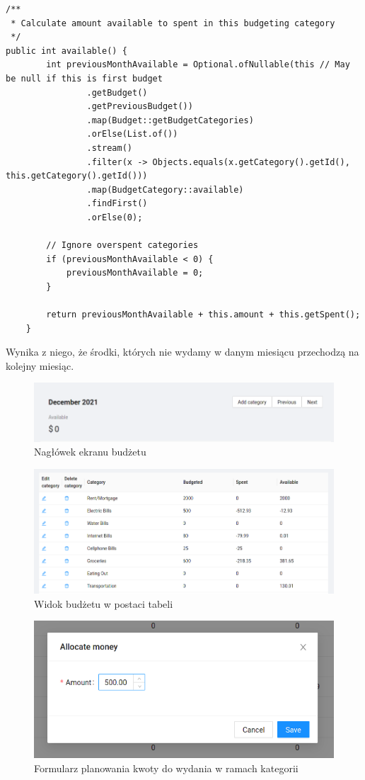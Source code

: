 \documentclass[shortabstract,inz]{iithesis}
\begin{document}
\begin{lstlisting}
/**
 * Calculate amount available to spent in this budgeting category
 */
public int available() {
        int previousMonthAvailable = Optional.ofNullable(this // May be null if this is first budget
                .getBudget()
                .getPreviousBudget())
                .map(Budget::getBudgetCategories)
                .orElse(List.of())
                .stream()
                .filter(x -> Objects.equals(x.getCategory().getId(), this.getCategory().getId()))
                .map(BudgetCategory::available)
                .findFirst()
                .orElse(0);

        // Ignore overspent categories
        if (previousMonthAvailable < 0) {
            previousMonthAvailable = 0;
        }

        return previousMonthAvailable + this.amount + this.getSpent();
    }
\end{lstlisting}
Wynika z niego, że środki, których nie wydamy w danym miesiącu przechodzą na kolejny miesiąc.
\begin{figure}
	\centering
	\includegraphics[scale=0.65]{screen-budget-header.png}
	\caption{Nagłówek ekranu budżetu}
	\label{fig:screen-budget-header}
\end{figure}
\begin{figure}
	\centering
	\includegraphics[scale=0.62]{screen-budget-table.png}
	\caption{Widok budżetu w postaci tabeli}
	\label{fig:screen-budget-table}
\end{figure}
\begin{figure}
	\centering
	\includegraphics[scale=0.7]{screen-budgeting-form.png}
	\caption{Formularz planowania kwoty do wydania w ramach kategorii}
	\label{fig:screen-budget-amount}
\end{figure}
\end{document}
